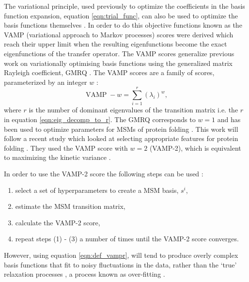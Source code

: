 The variational principle, used previously to optimize the coefficients in the basis function expansion, equation \ref{eqn:trial_func}, can also be used to optimize the basis functions themselves \cite{schererVariationalSelectionFeatures2019,husicOptimizedParameterSelection2016}. In order to do this objective functions known as the VAMP (variational approach to Markov processes) scores \cite{wuVariationalApproachLearning2020c} were derived which reach their upper limit when the resulting eigenfunctions become the exact eigenfunctions of the transfer operator. The VAMP scores generalize previous work on variationally optimising basis functions using the generalized matrix Rayleigh coefficient, GMRQ \cite{mcgibbonVariationalCrossvalidationSlow2015}. The VAMP scores are a family of scores, parameterized by an integer $w$ \cite{wuVariationalApproachLearning2020c}:
\begin{equation}\label{eqn:def_vampr}
\operatorname{VAMP}-w=\sum_{i=1}^{r}\left(\lambda_{i}\right)^{w}, 
\end{equation} 
where $r$ is the number of dominant eigenvalues of the transition matrix i.e. the $r$ in equation \ref{eqn:eig_decomp_to_r}. The GMRQ corresponds to $w=1$ and has been used to optimize parameters for MSMs of protein folding \cite{husicOptimizedParameterSelection2016}. This work will follow a recent study which looked at selecting appropriate features for protein folding \cite{schererVariationalSelectionFeatures2019}. They used the VAMP score with $w=2$ (VAMP-2), which is equivalent to maximizing the kinetic variance \cite{wuVariationalApproachLearning2020c}. 

In order to use the VAMP-2 score the following steps can be used  \cite{schererVariationalSelectionFeatures2019}:
\begin{enumerate}
    \item select a set of hyperparameters to create a MSM basis, $s^{i}$, 
    \item estimate the MSM transition matrix, 
    \item calculate the VAMP-2 score, 
    \item repeat steps (1) - (3) a number of times until the VAMP-2 score converges.
\end{enumerate}
However, using equation \ref{eqn:def_vampr}, will tend to produce overly complex basis functions that fit to noisy fluctuations in the data, rather than the `true' relaxation processes \cite{mcgibbonVariationalCrossvalidationSlow2015,wuVariationalApproachLearning2020c,schererVariationalSelectionFeatures2019}, a process known as over-fitting \cite{friedman2001elements}.

